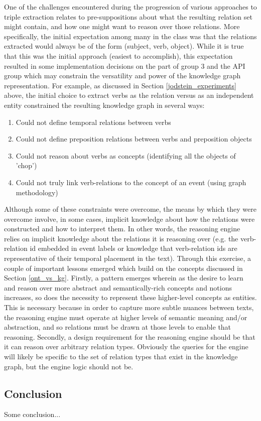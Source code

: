 \documentclass[11pt,letterpaper]{article}
\begin{document}
One of the challenges encountered during the progression of various approaches to triple extraction relates to pre-suppositions about what the resulting relation set might contain, and how one might want to reason over those relations.  More specifically, the initial expectation among many in the class was that the relations extracted would always be of the form (subject, verb, object).  While it is true that this was the initial approach (easiest to accomplish), this expectation resulted in some implementation decisions on the part of group 3 and the API group which may constrain the versatility and power of the knowledge graph representation.  For example, as discussed in Section \ref{jodstein_experiments} above, the initial choice to extract verbs as the relation versus as an independent entity constrained the resulting knowledge graph in several ways:

\begin{enumerate}
    \item Could not define temporal relations between verbs
    \item Could not define preposition relations between verbs and preposition objects
    \item Could not reason about verbs as concepts (identifying all the objects of 'chop')
    \item Could not truly link verb-relations to the concept of an event (using graph methodology)
\end{enumerate}

Although some of these constraints were overcome, the means by which they were overcome involve, in some cases, implicit knowledge about how the relations were constructed and how to interpret them.  In other words, the reasoning engine relies on implicit knowledge about the relations it is reasoning over (e.g. the verb-relation id embedded in event labels or knowledge that verb-relation ids are representative of their temporal placement in the text).  Through this exercise, a couple of important lessons emerged which build on the concepts discussed in Section \ref{ont_vs_kg}.  Firstly, a pattern emerges wherein as the desire to learn and reason over more abstract and semantically-rich concepts and notions increases, so does the necessity to represent these higher-level concepts as entities.  This is necessary because in order to capture more subtle nuances between texts, the reasoning engine must operate at higher levels of semantic meaning and/or abstraction, and so relations must be drawn at those levels to enable that reasoning.  Secondly, a design requirement for the reasoning engine should be that it can reason over arbitrary relation types.  Obviously the queries for the engine will likely be specific to the set of relation types that exist in the knowledge graph, but the engine logic should not be.




\subsection{Conclusion}

Some conclusion...



\end{document}
